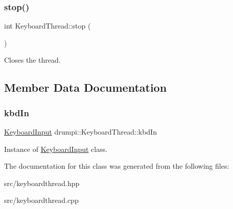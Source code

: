 \subsubsection{\texorpdfstring{stop()}{stop()}}
{\footnotesize\ttfamily int Keyboard\+Thread\+::stop (\begin{DoxyParamCaption}{ }\end{DoxyParamCaption})}

Closes the thread. 

\subsection{Member Data Documentation}
\mbox{\label{classdrumpi_1_1KeyboardThread_a2f248c78ba5f7bcd0f4db0fc3050ef4d}} 
\subsubsection{\texorpdfstring{kbd\+In}{kbdIn}}
{\footnotesize\ttfamily \hyperlink{classdrumpi_1_1KeyboardInput}{Keyboard\+Input} drumpi\+::\+Keyboard\+Thread\+::kbd\+In}

Instance of \hyperlink{classdrumpi_1_1KeyboardInput}{Keyboard\+Input} class. 

The documentation for this class was generated from the following files\+:\begin{DoxyCompactItemize}
\item 
src/keyboardthread.\+hpp\item 
src/keyboardthread.\+cpp\end{DoxyCompactItemize}
